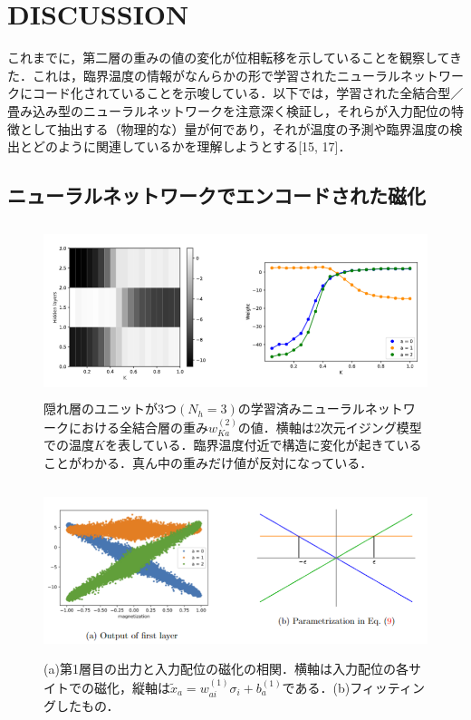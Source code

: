 \documentclass[a4paper,11pt]{jsarticle}
\begin{document}
\section{DISCUSSION}
これまでに，第二層の重みの値の変化が位相転移を示していることを観察してきた．これは，臨界温度の情報がなんらかの形で学習されたニューラルネットワークにコード化されていることを示唆している．以下では，学習された全結合型／畳み込み型のニューラルネットワークを注意深く検証し，それらが入力配位の特徴として抽出する（物理的な）量が何であり，それが温度の予測や臨界温度の検出とどのように関連しているかを理解しようとする[15, 17]．

\subsection{ニューラルネットワークでエンコードされた磁化}
\begin{figure}[hb]
  \begin{center}
    \includegraphics[height=5cm]{image/Figure3.png}
    \caption{隠れ層のユニットが3つ$(N_h=3)$の学習済みニューラルネットワークにおける全結合層の重み$w_{Ka}^{(2)}$の値．横軸は2次元イジング模型での温度$K$を表している．臨界温度付近で構造に変化が起きていることがわかる．真ん中の重みだけ値が反対になっている．}
  \end{center}
\end{figure}
\begin{figure}[hb]
  \begin{center}
    \includegraphics[height=5cm]{image/Figure4.png}
    \caption{(a)第1層目の出力と入力配位の磁化の相関．横軸は入力配位の各サイトでの磁化，縦軸は$\tilde{x}_a=w_{ai}^{(1)}\sigma_i+b_a^{(1)}$である．(b)フィッティングしたもの．}
  \end{center}
\end{figure}
\end{document}
